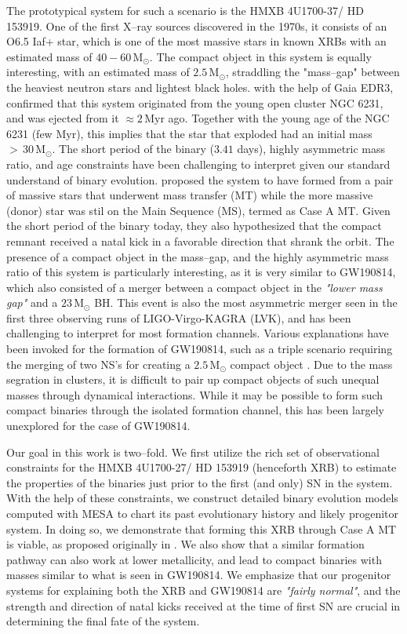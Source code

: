 \documentclass[linenumbers,trackchanges,twocolumn]{aastex701}
\newcommand{\Mdot}{\mathrm{M}_{\odot}}
\newcommand{\Myr}{\mathrm{Myr}}
\begin{document}
The prototypical system for such a scenario is the HMXB 4U1700-37/ HD 153919. One of the first X--ray sources discovered in the 1970s, it consists of an O6.5 Iaf+ star, which is one of the most massive stars in known XRBs with an estimated mass of $40-60\,\Mdot$. The compact object in this system is equally interesting, with an estimated mass of $2.5\,\Mdot$, straddling the "mass--gap" between the heaviest neutron stars and lightest black holes. with the help of Gaia EDR3, \cite{2021A&A...655A..31V} confirmed that this system originated from the young open cluster NGC 6231, and was ejected from it $\approx 2\,\Myr$ ago. Together with the young age of the NGC 6231 (few $\Myr$), this implies that the star that exploded had an initial mass $>\,30\,\Mdot$. The short period of the binary ($3.41$ days), highly asymmetric mass ratio, and age constraints have been challenging to interpret given our standard understand of binary evolution. \cite{2021A&A...655A..31V} proposed the system to have formed from a pair of massive stars that underwent mass transfer (MT) while the more massive (donor) star was stil on the Main Sequence (MS), termed as Case A MT. Given the short period of the binary today, they also hypothesized that the compact remnant received a natal kick in a favorable direction that shrank the orbit. The presence of a compact object in the mass--gap, and the highly asymmetric mass ratio of this system is particularly interesting, as it is very similar to GW190814, which also consisted of a merger between a compact object in the \textit{"lower mass gap"} and a $23\,\Mdot$ BH. This event is also the most asymmetric merger seen in the first three observing runs of LIGO-Virgo-KAGRA (LVK), and has been challenging to interpret for most formation channels. Various explanations have been invoked for the formation of GW190814, such as a triple scenario requiring the merging of two NS's for creating a $2.5\,\Mdot$ compact object \cite{2021MNRAS.500.1817L}. Due to the mass segration in clusters, it is difficult to pair up compact objects of such unequal masses through dynamical interactions. While it may be possible to form such compact binaries through the isolated formation channel, this has been largely unexplored for the case of GW190814. 

Our goal in this work is two--fold. We first utilize the rich set of observational constraints for the HMXB 4U1700-27/ HD 153919 (henceforth XRB) to estimate the properties of the binaries just prior to the first (and only) SN in the system. With the help of these constraints, we construct detailed binary evolution models computed with MESA to chart its past evolutionary history and likely progenitor system. In doing so, we demonstrate that forming this XRB through Case A MT is viable, as proposed originally in \cite{2021A&A...655A..31V}. We also show that a similar formation pathway can also work at lower metallicity, and lead to compact binaries with masses similar to what is seen in GW190814. We emphasize that our progenitor systems for explaining both the XRB and GW190814 are \textit{"fairly normal"}, and the strength and direction of natal kicks received at the time of first SN are crucial in determining the final fate of the system.
\end{document}
